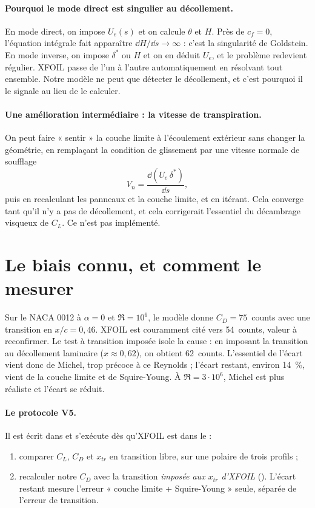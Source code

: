 \paragraph{Pourquoi le mode direct est singulier au décollement.} En mode direct, on impose $U_e(s)$ et on calcule $\theta$ et $H$. Près de $c_f=0$, l'équation intégrale fait apparaître $\dd H/\dd s\to\infty$ : c'est la singularité de Goldstein. En mode inverse, on impose $\delta^*$ ou $H$ et on en déduit $U_e$, et le problème redevient régulier. XFOIL passe de l'un à l'autre automatiquement en résolvant tout ensemble. Notre modèle ne peut que détecter le décollement, et c'est pourquoi il le signale au lieu de le calculer.

\paragraph{Une amélioration intermédiaire : la vitesse de transpiration.} On peut faire « sentir » la couche limite à l'écoulement extérieur sans changer la géométrie, en remplaçant la condition de glissement par une vitesse normale de soufflage
\[
V_n=\frac{\dd(U_e\,\delta^*)}{\dd s},
\]
puis en recalculant les panneaux et la couche limite, et en itérant. Cela converge tant qu'il n'y a pas de décollement, et cela corrigerait l'essentiel du décambrage visqueux de $C_L$. Ce n'est pas implémenté.

\section{Le biais connu, et comment le mesurer}
Sur le NACA 0012 à $\alpha=0$ et $\Re=10^6$, le modèle donne $C_D=75$~counts avec une transition en $x/c=0{,}46$. XFOIL est couramment cité vers 54~counts, valeur à reconfirmer. Le test à transition imposée isole la cause : en imposant la transition au décollement laminaire ($x\approx0{,}62$), on obtient 62~counts. L'essentiel de l'écart vient donc de Michel, trop précoce à ce Reynolds ; l'écart restant, environ 14~\%, vient de la couche limite et de Squire-Young. À $\Re=3\cdot10^6$, Michel est plus réaliste et l'écart se réduit.

\paragraph{Le protocole V5.} Il est écrit dans  et s'exécute dès qu'XFOIL est dans le  :
\begin{enumerate}
\item comparer $C_L$, $C_D$ et $x_{tr}$ en transition libre, sur une polaire de trois profils ;
\item recalculer notre $C_D$ avec la transition \emph{imposée aux $x_{tr}$ d'XFOIL} (). L'écart restant mesure l'erreur « couche limite + Squire-Young » seule, séparée de l'erreur de transition.
\end{enumerate}

